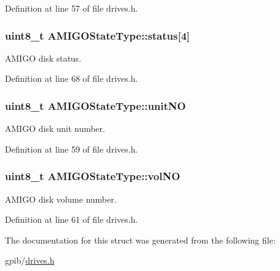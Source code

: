 Definition at line 57 of file drives.\+h.

\subsubsection[{\texorpdfstring{status}{status}}]{\setlength{\rightskip}{0pt plus 5cm}uint8\+\_\+t A\+M\+I\+G\+O\+State\+Type\+::status\mbox{[}4\mbox{]}}\hypertarget{structAMIGOStateType_a20ecb3cbbcb1fe4746c2d38edc125412}{}\label{structAMIGOStateType_a20ecb3cbbcb1fe4746c2d38edc125412}


A\+M\+I\+GO disk status. 



Definition at line 68 of file drives.\+h.

\subsubsection[{\texorpdfstring{unit\+NO}{unitNO}}]{\setlength{\rightskip}{0pt plus 5cm}uint8\+\_\+t A\+M\+I\+G\+O\+State\+Type\+::unit\+NO}\hypertarget{structAMIGOStateType_a3d0cc02f8822c817feddf93dd08a5034}{}\label{structAMIGOStateType_a3d0cc02f8822c817feddf93dd08a5034}


A\+M\+I\+GO disk unit number. 



Definition at line 59 of file drives.\+h.

\subsubsection[{\texorpdfstring{vol\+NO}{volNO}}]{\setlength{\rightskip}{0pt plus 5cm}uint8\+\_\+t A\+M\+I\+G\+O\+State\+Type\+::vol\+NO}\hypertarget{structAMIGOStateType_a9825e282ac5844225a43b7f0835da67f}{}\label{structAMIGOStateType_a9825e282ac5844225a43b7f0835da67f}


A\+M\+I\+GO disk volume number. 



Definition at line 61 of file drives.\+h.



The documentation for this struct was generated from the following file\+:\begin{DoxyCompactItemize}
\item 
gpib/\hyperlink{drives_8h}{drives.\+h}\end{DoxyCompactItemize}
